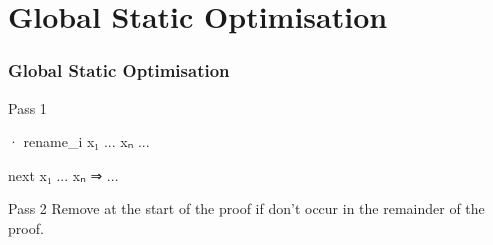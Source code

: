 \section{Global Static Optimisation}

\begin{frame}[fragile]
  \frametitle{Global Static Optimisation}

  \begin{block}{Pass 1}
    \medskip
    \begin{minipage}{.4\textwidth}
      \begin{leancode}
        · rename_i x₁ ... xₙ
          ...
      \end{leancode}
    \end{minipage}
    \Longrightarrow
    \begin{minipage}{.4\textwidth}
      \begin{leancode}
        next x₁ ... xₙ ⇒ ...
      \end{leancode}
    \end{minipage}
  \end{block}

  \pause\bigskip

  \begin{block}{Pass 2}
    Remove  at the start of the proof if  don't occur in the remainder of the proof.
  \end{block}
\end{frame}

\begin{frame}
\end{frame}



